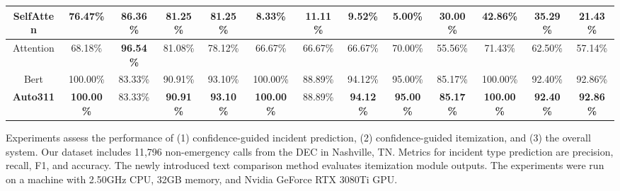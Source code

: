 \begin{table}[]
\begin{tabular}{||c|cccc|cccc|cccc||}
SelfAtten     & \multicolumn{1}{c|}{76.47\%}           & \multicolumn{1}{c|}{86.36\%}           & \multicolumn{1}{c|}{81.25\%}          & 81.25\%          & \multicolumn{1}{c|}{8.33\%}            & \multicolumn{1}{c|}{11.11\%}           & \multicolumn{1}{c|}{9.52\%}           & 5.00\%           & \multicolumn{1}{c|}{30.00\%}           & \multicolumn{1}{c|}{42.86\%}           & \multicolumn{1}{c|}{35.29\%}          & 21.43\%          \\ \hline
Attention     & \multicolumn{1}{c|}{68.18\%}           & \multicolumn{1}{c|}{\textbf{96.54\%}} & \multicolumn{1}{c|}{81.08\%}          & 78.12\%          & \multicolumn{1}{c|}{66.67\%}           & \multicolumn{1}{c|}{66.67\%}           & \multicolumn{1}{c|}{66.67\%}          & 70.00\%          & \multicolumn{1}{c|}{55.56\%}           & \multicolumn{1}{c|}{71.43\%}           & \multicolumn{1}{c|}{62.50\%}          & 57.14\%          \\ \hline
Bert          & \multicolumn{1}{c|}{100.00\%} & \multicolumn{1}{c|}{83.33\%}           & \multicolumn{1}{c|}{90.91\%} & 93.10\% & \multicolumn{1}{c|}{100.00\%} & \multicolumn{1}{c|}{88.89\%}  & \multicolumn{1}{c|}{94.12\%} & 95.00\% & \multicolumn{1}{c|}{85.17\%} & \multicolumn{1}{c|}{100.00\%}  & \multicolumn{1}{c|}{92.40\%} & 92.86\% \\ \hline
\textbf{Auto311}          & \multicolumn{1}{c|}{\textbf{100.00\%}} & \multicolumn{1}{c|}{83.33\%}           & \multicolumn{1}{c|}{\textbf{90.91\%}} & \textbf{93.10\%} & \multicolumn{1}{c|}{\textbf{100.00\%}} & \multicolumn{1}{c|}{88.89\%}  & \multicolumn{1}{c|}{\textbf{94.12\%}} & \textbf{95.00\%} & \multicolumn{1}{c|}{\textbf{85.17\%}} & \multicolumn{1}{c|}{\textbf{100.00\%}}  & \multicolumn{1}{c|}{\textbf{92.40\%}} & \textbf{92.86\%} \\ \hline
\end{tabular}
\label{tab:classification}
\end{table}


Experiments assess the performance of (1) confidence-guided incident prediction, (2) confidence-guided itemization, and (3) the overall system. Our dataset includes 11,796 non-emergency calls from the DEC in Nashville, TN. Metrics for incident type prediction are precision, recall, F1, and accuracy. The newly introduced text comparison method evaluates itemization module outputs. The experiments were run on a machine with 2.50GHz CPU, 32GB memory, and Nvidia GeForce RTX 3080Ti GPU.

